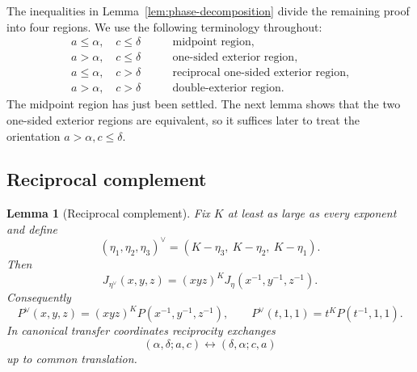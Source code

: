 \documentclass[11pt]{article}
\newtheorem{lemma}[theorem]{Lemma}
\theoremstyle{definition}
\begin{document}
The inequalities in Lemma~\ref{lem:phase-decomposition} divide the remaining proof into four regions. We use the following terminology throughout:
\begin{align*}
a\le\alpha,\quad c\le\delta
&\qquad\text{midpoint region},\\
a>\alpha,\quad c\le\delta
&\qquad\text{one-sided exterior region},\\
a\le\alpha,\quad c>\delta
&\qquad\text{reciprocal one-sided exterior region},\\
a>\alpha,\quad c>\delta
&\qquad\text{double-exterior region}.
\end{align*}
The midpoint region has just been settled. The next lemma shows that the two one-sided exterior regions are equivalent, so it suffices later to treat the orientation \(a>\alpha, c\le\delta\).

\subsection{Reciprocal complement}

\begin{lemma}[Reciprocal complement]
\label{lem:reciprocal}
Fix \(K\) at least as large as every exponent and define
\begin{equation*}
(\eta_1,\eta_2,\eta_3)^\vee
=
(K-\eta_3,\ K-\eta_2,\ K-\eta_1).
\end{equation*}
Then
\begin{equation*}
J_{\eta^\vee}(x,y,z)
=
(xyz)^KJ_\eta(x^{-1},y^{-1},z^{-1}).
\end{equation*}
Consequently
\begin{equation*}
P^\vee(x,y,z)
=
(xyz)^KP(x^{-1},y^{-1},z^{-1}),
\qquad
P^\vee(t,1,1)
=
t^KP(t^{-1},1,1).
\end{equation*}
In canonical transfer coordinates reciprocity exchanges
\begin{equation*}
(\alpha,\delta;a,c)
\longleftrightarrow
(\delta,\alpha;c,a)
\end{equation*}
up to common translation.
\end{lemma}
\end{document}
